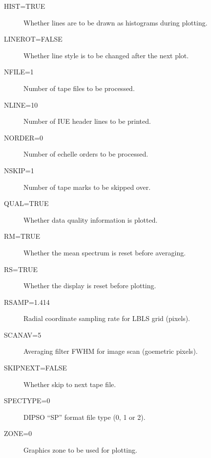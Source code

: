 \begin {description}
\item [HIST=TRUE] Whether lines are to be drawn as histograms during 
plotting.
\item [LINEROT=FALSE] Whether line style is to be changed after the next 
plot.
\item [NFILE=1] Number of tape files to be processed.
\item [NLINE=10] Number of IUE header lines to be printed.
\item [NORDER=0] Number of echelle orders to be processed.
\item [NSKIP=1] Number of tape marks to be skipped over.
\item [QUAL=TRUE] Whether data quality information is plotted.
\item [RM=TRUE] Whether the mean spectrum is reset before averaging.
\item [RS=TRUE] Whether the display is reset before plotting.
\item [RSAMP=1.414] Radial coordinate sampling rate for LBLS grid (pixels).
\item [SCANAV=5] Averaging filter FWHM for image scan (goemetric pixels).
\item [SKIPNEXT=FALSE] Whether skip to next tape file.
\item [SPECTYPE=0] DIPSO ``SP'' format file type (0, 1 or 2).
\item [ZONE=0] Graphics zone to be used for plotting.
\end {description}


